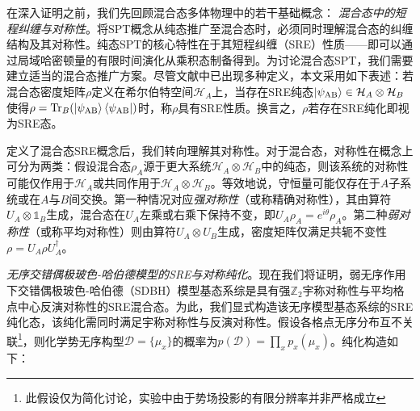 \documentclass[preprint,superscriptaddress,floatfix,nofootinbib]{revtex4-2}
\begin{document}
在深入证明之前，我们先回顾混合态多体物理中的若干基础概念：
\textit{混合态中的短程纠缠与对称性}。将SPT概念从纯态推广至混合态时，必须同时理解混合态的纠缠结构及其对称性。纯态SPT的核心特性在于其短程纠缠（SRE）性质——即可以通过局域哈密顿量的有限时间演化从乘积态制备得到。为讨论混合态SPT，我们需要建立适当的混合态推广方案。尽管文献中已出现多种定义\cite{Ma2023, Chen2024}，本文采用如下表述：若混合态密度矩阵$\rho$定义在希尔伯特空间$\mathcal{H}_A$上，当存在SRE纯态$\ket{\psi_{\text{AB}}} \in \mathcal{H}_A \otimes \mathcal{H}_B$使得$\rho = \text{Tr}_{B}(\ket{\psi_{\text{AB}}} \bra{\psi_{\text{AB}}})$时，称$\rho$具有SRE性质。换言之，$\rho$若存在SRE纯化即视为SRE态。

定义了混合态SRE概念后，我们转向理解其对称性。对于混合态，对称性在概念上可分为两类：假设混合态$\rho_A$源于更大系统$\mathcal{H}_{A} \otimes \mathcal{H}_{B}$中的纯态，则该系统的对称性可能仅作用于$\mathcal{H}_A$或共同作用于$\mathcal{H}_A \otimes \mathcal{H}_B$。等效地说，守恒量可能仅存在于$A$子系统或在$A$与$B$间交换。第一种情况对应\textit{强对称性}（或称精确对称性），其由算符$U_A \otimes \mathds{1}_{B}$生成，混合态在$U_A$左乘或右乘下保持不变，即$U_A \rho_A = e^{i \theta} \rho_A$。第二种\textit{弱对称性}（或称平均对称性）则由算符$U_A \otimes U_B$生成，密度矩阵仅满足共轭不变性$\rho = U_A \rho U_A^{\dagger}$。

\textit{无序交错偶极玻色-哈伯德模型的SRE与对称纯化}。现在我们将证明，弱无序作用下交错偶极玻色-哈伯德（SDBH）模型基态系综是具有强$\mathbb{Z}_2$宇称对称性与平均格点中心反演对称性的SRE混合态。为此，我们显式构造该无序模型基态系综的SRE纯化态，该纯化需同时满足宇称对称性与反演对称性。假设各格点无序分布互不关联\footnote{此假设仅为简化讨论，实验中由于势场投影的有限分辨率并非严格成立}，则化学势无序构型$\mathcal{D} = \{\mu_x\}$的概率为$p(\mathcal{D}) = \prod_{x} p_x(\mu_x)$。纯化构造如下：
\end{document}
